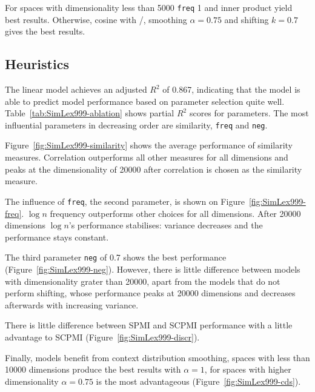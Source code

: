 For spaces with dimensionality less than 5000 \texttt{freq} 1 and inner product yield best results. Otherwise, cosine with \logNSCPMI/, smoothing $\alpha=0.75$ and shifting $k=0.7$ gives the best results.



\subsection{Heuristics}
\label{sec:heuristics-simlex}



% 

The linear model achieves an adjusted $R^2$ of 0.867, indicating that the model is able to predict model performance based on parameter selection quite well. Table~\ref{tab:SimLex999-ablation} shows partial $R^2$ scores for parameters. The most influential parameters in decreasing order are similarity, \texttt{freq} and \texttt{neg}.


Figure~\ref{fig:SimLex999-similarity} shows the average performance of similarity measures. Correlation outperforms all other measures for all dimensions and peaks at the dimensionality of 20000 after correlation is chosen as the similarity measure.

% 
The influence of \texttt{freq}, the second parameter, is shown on Figure~\ref{fig:SimLex999-freq}. $\log n$ frequency outperforms other choices for all dimensions. After 20000 dimensions $\log n$'s performance stabilises: variance decreases and the performance stays constant.


The third parameter \texttt{neg} of 0.7 shows the best performance (Figure~\ref{fig:SimLex999-neg}). However, there is little difference between models with dimensionality grater than 20000, apart from the models that do not perform shifting, whose performance peaks at 20000 dimensions and decreases afterwards with increasing variance.

% 
There is little difference between SPMI and SCPMI performance with a little advantage to SCPMI (Figure~\ref{fig:SimLex999-discr}).


Finally, models benefit from context distribution smoothing, spaces with less than 10000 dimensions produce the best results with $\alpha = 1$, for spaces with higher dimensionality $\alpha = 0.75$ is the most advantageous (Figure~\ref{fig:SimLex999-cds}).

